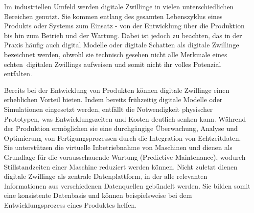 Im industriellen Umfeld werden digitale Zwillinge in vielen unterschiedlichen Bereichen genutzt.
Sie kommen entlang des gesamten Lebenszyklus eines Produkts oder Systems zum Einsatz - von der Entwicklung über die Produktion bis hin zum Betrieb und der Wartung. 
Dabei ist jedoch zu beachten, das in der Praxis häufig auch digital Modelle oder digitale Schatten als digitale Zwillinge bezeichnet werden, obwohl sie technisch gesehen nicht alle Merkmale eines \glqq echten\grqq~digitalen Zwillings aufweisen und somit nicht ihr volles Potenzial entfalten.

Bereits bei der Entwicklung von Produkten können digitale Zwillinge einen erheblichen Vorteil bieten. 
Indem bereits frühzeitig digitale Modelle oder Simulationen eingesetzt werden, entfällt die Notwendigkeit physischer Prototypen, was Entwicklungszeiten und Kosten deutlich senken kann. Während der Produktion ermöglichen sie eine durchgängige Überwachung, Analyse und Optimierung von Fertigungsprozessen durch die Integration von Echtzeitdaten.
Sie unterstützen die virtuelle Inbetriebnahme von Maschinen und dienen als Grundlage für die vorausschauende Wartung (Predictive Maintenance), wodurch Stillstandzeiten einer Maschine reduziert werden können.
Nicht zuletzt dienen digitale Zwillinge als zentrale Datenplattform, in der alle relevanten Informationen aus verschiedenen Datenquellen gebündelt werden.
Sie bilden somit eine konsistente Datenbasis und können beispielsweise bei dem Entwicklungsprozess eines Produktes helfen. \cite{DTForSmartManufacturing}




